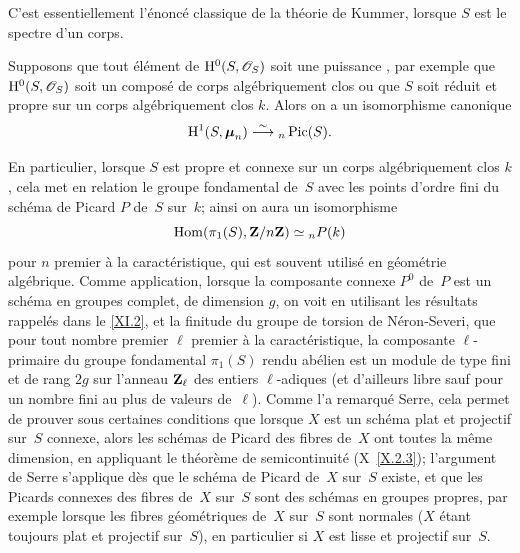 C'est essentiellement l'\'enonc\'e classique de la th\'eorie de
Kummer, lorsque $S$ est le spectre d'un corps.

\begin{corollaire}
\label{XI.6.6} Supposons que tout \'el\'ement de
$\H^0(S,\cal{O}_S)$ soit une puissance \nieme, par exemple que
$\H^0(S,\cal{O}_S)$ soit un compos\'e de corps alg\'ebriquement
clos ou que $S$ soit r\'eduit et propre sur un corps
alg\'ebriquement clos $k$. Alors on a un isomorphisme canonique
$$
\mathrm{H}^1(S,\boldsymbol{\mu}_n)\overset{\sim}{\longrightarrow}{}_n\operatorname{Pic}(S).
$$
\end{corollaire}

En particulier, lorsque $S$ est propre et connexe sur un corps
alg\'ebriquement clos $k$, cela met en relation le groupe
fondamental de~$S$ avec les points d'ordre fini du sch\'ema de
Picard $P$ de~$S$ sur~$k$; ainsi on aura un isomorphisme
$$
\operatorname{Hom}(\pi_1(S),\mathbf{Z}/n\mathbf{Z})\simeq {_n P}(k)
$$
pour $n$ premier \`a la caract\'eristique, qui est souvent
utilis\'e en g\'eom\'etrie
alg\'ebrique. Comme application, lorsque la composante connexe $P^0$
de~$P$ est un sch\'ema en groupes complet, de dimension $g$, on voit
en utilisant les r\'esultats rappel\'es dans le \No \ref{XI.2}, et la
finitude du groupe de torsion de
N\'eron-Severi,
que pour
tout nombre premier $\ell$ premier \`a la caract\'eristique, la
composante $\ell$-primaire du groupe fondamental $\pi_1(S)$ rendu
ab\'elien est un module de type fini et de rang $2g$ sur l'anneau
$\mathbf{Z}_\ell$ des entiers $\ell$-adiques (et d'ailleurs libre sauf pour
un nombre fini au plus de valeurs de~$\ell$). Comme l'a remarqu\'e
Serre, cela permet de prouver sous certaines conditions que lorsque
$X$ est un sch\'ema plat et projectif sur~$S$ connexe, alors les
sch\'emas de Picard des fibres de~$X$ ont toutes la m\^eme
dimension, en appliquant le th\'eor\`eme de semicontinuit\'e
(X~\ref{X.2.3}); l'argument de Serre s'applique d\`es que le
sch\'ema de Picard de~$X$ sur~$S$ existe, et que les Picards
connexes des fibres de~$X$ sur~$S$ sont des sch\'emas en groupes
propres, par exemple lorsque les fibres g\'eom\'etriques de~$X$
sur~$S$ sont normales ($X$ \'etant toujours plat et projectif
sur~$S$), en particulier si $X$ est lisse et projectif sur~$S$.


